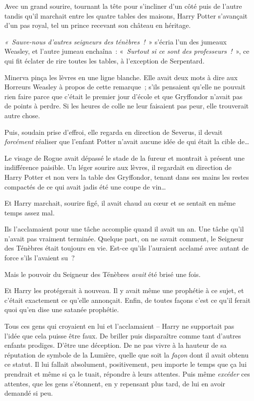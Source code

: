 Avec un grand sourire, tournant la tête pour s'incliner d'un côté puis de l'autre tandis qu'il marchait entre les quatre tables des maisons, Harry Potter s'avançait d'un pas royal, tel un prince recevant son château en héritage.

\emph{«~Sauve-nous d'autres seigneurs des ténèbres~!}~» s'écria l'un des jumeaux Weasley, et l'autre jumeau enchaîna~: «~\emph{Surtout si ce sont des professeurs~!}~», ce qui fit éclater de rire toutes les tables, à l'exception de Serpentard.

Minerva pinça les lèvres en une ligne blanche.
Elle avait deux mots à dire aux Horreurs Weasley à propos de cette remarque~;
s'ils pensaient qu'elle ne pouvait rien faire parce que c'était le premier jour d'école et que Gryffondor n'avait pas de points à perdre.
Si les heures de colle ne leur faisaient pas peur, elle trouverait autre chose.

Puis, soudain prise d'effroi, elle regarda en direction de Severus, il devait \emph{forcément} réaliser que l'enfant Potter n'avait aucune idée de qui était la cible de…

Le visage de Rogue avait dépassé le stade de la fureur et montrait à présent une indifférence paisible.
Un léger sourire aux lèvres, il regardait en direction de Harry Potter et non vers la table des Gryffondor, tenant dans ses mains les restes compactés de ce qui avait jadis été une coupe de vin…

\later

Et Harry marchait, sourire figé, il avait chaud au cœur et se sentait en même temps assez mal.

Ils l'acclamaient pour une tâche accomplie quand il avait un an.
Une tâche qu'il n'avait pas vraiment terminée.
Quelque part, on ne savait comment, le Seigneur des Ténèbres était toujours en vie.
Est-ce qu'ils l'auraient acclamé avec autant de force s'ils l'avaient su~?

Mais le pouvoir du Seigneur des Ténèbres \emph{avait} été brisé une fois.

Et Harry les protégerait à nouveau.
Il y avait même une prophétie à ce sujet, et c'était exactement ce qu'elle annonçait.
Enfin, de toutes façons c'est ce qu'il ferait quoi qu'en dise une satanée prophétie.

Tous ces gens qui croyaient en lui et l'acclamaient -- Harry ne supportait pas l'idée que cela puisse être faux.
De briller puis disparaître comme tant d'autres enfants prodiges.
D'être une déception.
De ne pas vivre à la hauteur de sa réputation de symbole de la Lumière, quelle que soit la \emph{façon} dont il avait obtenu ce statut.
Il lui fallait absolument, positivement, peu importe le temps que ça lui prendrait et même si ça le tuait, répondre à leurs attentes.
Puis même \emph{excéder} ces attentes, que les gens s'étonnent, en y repensant plus tard, de lui en avoir demandé si peu.

